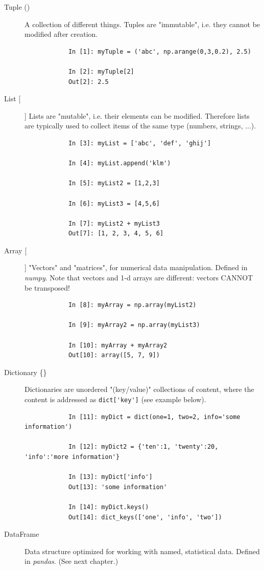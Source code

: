 \begin{description}
  \item[Tuple ()]  A collection of different things. Tuples are "immutable", i.e. they cannot be modified after creation.
      \begin{lstlisting}
            In [1]: myTuple = ('abc', np.arange(0,3,0.2), 2.5)

            In [2]: myTuple[2]
            Out[2]: 2.5
        \end{lstlisting}

  \item[List [] ]  Lists are "mutable", i.e. their elements can be modified. Therefore lists are typically used to collect items of the same type (numbers, strings, ...).
      \begin{lstlisting}
            In [3]: myList = ['abc', 'def', 'ghij']

            In [4]: myList.append('klm')

            In [5]: myList2 = [1,2,3]

            In [6]: myList3 = [4,5,6]

            In [7]: myList2 + myList3
            Out[7]: [1, 2, 3, 4, 5, 6]
        \end{lstlisting}

  \item[Array [] ]  "Vectors" and "matrices", for numerical data manipulation. Defined in \emph{numpy}. Note that vectors and 1-d arrays are different: vectors CANNOT be transposed!
      \begin{lstlisting}
            In [8]: myArray = np.array(myList2)

            In [9]: myArray2 = np.array(myList3)

            In [10]: myArray + myArray2
            Out[10]: array([5, 7, 9])
        \end{lstlisting}

  \item[Dictionary \{\}] Dictionaries are unordered "(key/value)" collections of content, where the content is addressed as \lstinline{dict['key']} (see example below).
      \begin{lstlisting}
            In [11]: myDict = dict(one=1, two=2, info='some information')

            In [12]: myDict2 = {'ten':1, 'twenty':20, 'info':'more information'}

            In [13]: myDict['info']
            Out[13]: 'some information'

            In [14]: myDict.keys()
            Out[14]: dict_keys(['one', 'info', 'two'])
      \end{lstlisting}

  \item[DataFrame] Data structure optimized for working with named, statistical data. Defined in \emph{pandas}. (See next chapter.)
\end{description}


